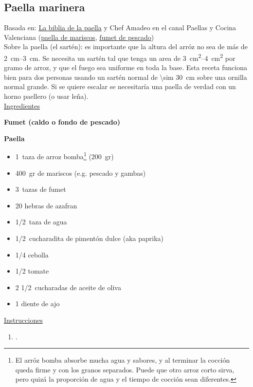 \subsection{Paella marinera}

Basada en: \href{https://www.la-biblia-de-la-paella.es/recette/paella-de-marisco/}{La biblia de la paella} y Chef Amadeo en el canal Paellas y Cocina Valenciana (\href{https://www.youtube.com/watch?v=WbaWsTqg9CY}{paella de mariscos}, \href{https://www.youtube.com/watch?v=rem5NKXjEBo}{fumet de pescado}) \\

Sobre la paella (el sartén): es importante que la altura del arróz no sea de más de \SIrange{2}{3}{cm}. Se necesita un sartén tal que tenga un area de \SIrange{3}{4}{cm^2} por gramo de arroz, y que el fuego sea uniforme en toda la base. Esta receta funciona bien para dos personas usando un sartén normal de \SI{\sim 30}{cm} sobre una ornilla normal grande. Si se quiere escalar se necesitaría una paella de verdad con un horno paellero (o usar leña).\\

\underline{Ingredientes}

\textbf{Fumet (caldo o fondo de pescado)}

\textbf{Paella}
\begin{itemize}
\item \SI{1}{taza} de arroz bomba\footnote{El arróz bomba absorbe mucha agua y sabores, y al terminar la cocción queda firme y con los granos separados. Puede que otro arroz corto sirva, pero quizá la proporción de agua y el tiempo de cocción sean diferentes.} (\SI{200}{gr})
\item \SI{400}{gr} de mariscos (e.g. pescado y gambas)
\item \SI{3}{tazas} de fumet
\item 20 hebras de azafran
\item \SI{1/2}{taza} de agua
\item \SI{1/2}{cucharadita} de pimentón dulce (aka paprika)
\item \num{1/4} cebolla
\item \num{1/2} tomate
\item 2 \SI{1/2}{cucharadas} de aceite de oliva
\item 1 diente de ajo
\end{itemize}


\underline{Instrucciones}

\begin{enumerate}
\item .
\end{enumerate}

